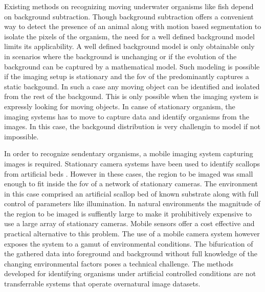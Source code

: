 \documentclass {udthesis}
\begin{document}
Existing methods on recognizing moving underwater organisms like fish depend on background subtraction. Though background subtraction 
offers a convenient way to detect the presence of an animal along with motion based segmentation to isolate the pixels of the organism, the need for a well defined background model limits its applicability. A well defined background model is only obtainable only in scenarios where the background is unchanging or if the evolution of the background can be captured by a mathematical model. Such modeling is possible if the imaging setup is stationary and the \gls{fov} of the predominantly captures a static backgound. In such a case any moving object can be identified and isolated from the rest of the backgound. This is only possible when the imaging system is expressly looking for moving objects. In canse of stationary organism, the imaging systems has to move to capture data and identify organisms from the images. In this case, the backgound distribution is very challengin to model if not impossible.

In order to recognize sendentary organisms, a mobile imaging system capturing images is required. Stationary camera systems have been used to identify scallops from artificial beds \cite{enomoto9, enomoto10}. However in these cases, the region to be imaged was small enough to fit inside the \gls{fov} of a network of stationary cameras. The environment in this case comprised an artificial scallop bed of known substrate along with full control of parameters like illumination. In natural environments the magnitude of the region to be imaged is suffiently large to make it prohibitively expensive to use a large array of stationary cameras. Mobile sensors offer a cost effective and practical alternative to this problem. The use of a mobile camera system however exposes the system to a gamut of environmental conditions. The bifurication of the gathered data into foreground and background without full knowledge of the changing environmental factors poses a technical challenge. The methods developed for identifying organisms under artificial controlled conditions are not transferrable systems that operate overnatural image datasets.
\end{document}
